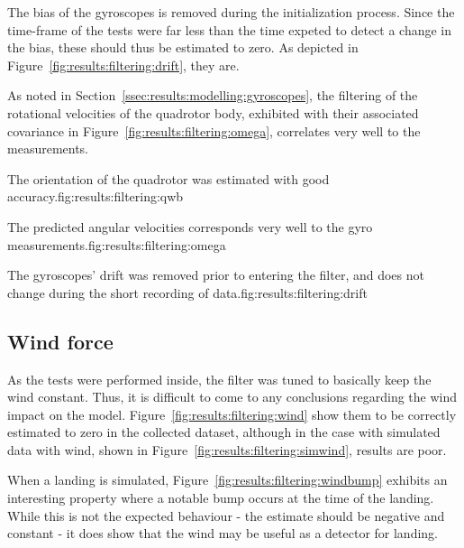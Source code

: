     The bias of the gyroscopes is removed during the initialization process.
    Since the time-frame of the tests were far less than the time expeted to
    detect a change in the bias, these should thus be estimated to zero.
    As depicted in Figure~\ref{fig:results:filtering:drift}, they are.

    As noted in Section~\ref{ssec:results:modelling:gyroscopes}, the
    filtering of the rotational velocities of the quadrotor body,
    exhibited with their associated covariance in Figure~\ref{fig:results:filtering:omega},
    correlates very well to the measurements.
    \begin{subfigures}{The orientation of the quadrotor was estimated with good accuracy.}{fig:results:filtering:qwb}
    \end{subfigures}

    \begin{subfigures}{The predicted angular velocities corresponds very well to the gyro measurements.}{fig:results:filtering:omega}
    \end{subfigures}

    \begin{subfigures}{The gyroscopes' drift was removed prior to entering the filter, and does not change during the short recording of data.}{fig:results:filtering:drift}
    \end{subfigures}

\subsection{Wind force}
    As the tests were performed inside, the filter was tuned to basically keep the
    wind constant. Thus, it is difficult to come to any conclusions regarding the
    wind impact on the model. Figure~\ref{fig:results:filtering:wind}
    show them to be correctly estimated to zero in the collected dataset,
    although in the case with simulated data with wind, shown in Figure~\ref{fig:results:filtering:simwind},
    results are poor.

    When a landing is simulated, Figure~\ref{fig:results:filtering:windbump}
    exhibits an interesting property where a notable bump occurs at the
    time of the landing. While this is not the expected behaviour
    - the estimate should be negative and constant -
    it does show that the wind may be useful as a detector for landing.

